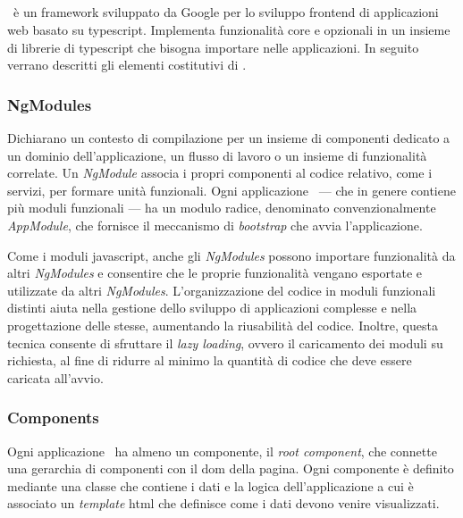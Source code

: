 \subsection{\angular}

\angular~è un \gls{framework} sviluppato da Google per lo sviluppo \gls{frontend} di applicazioni web basato su \gls{typescript}. Implementa funzionalità core e opzionali in un insieme di librerie di \gls{typescript} che bisogna importare nelle applicazioni. In seguito verrano descritti gli elementi costitutivi di \angular.


\subsubsection{NgModules}
Dichiarano un contesto di compilazione per un insieme di componenti dedicato a un dominio dell'applicazione, un flusso di lavoro o un insieme di funzionalità correlate. Un \textit{NgModule} associa i propri componenti al codice relativo, come i servizi, per formare unità funzionali.
% 
Ogni applicazione \angular~--- che in genere contiene più moduli funzionali ---  ha un modulo radice, denominato convenzionalmente \textit{AppModule}, che fornisce il meccanismo di \textit{bootstrap} che avvia l'applicazione.

Come i moduli \gls{javascript}, anche gli \textit{NgModules} possono importare funzionalità da altri \textit{NgModules} e consentire che le proprie funzionalità vengano esportate e utilizzate da altri \textit{NgModules}.
%
L'organizzazione del codice in moduli funzionali distinti aiuta nella gestione dello sviluppo di applicazioni complesse e nella progettazione delle stesse, aumentando la riusabilità del codice. Inoltre, questa tecnica consente di sfruttare il \textit{lazy loading}, ovvero il caricamento dei moduli su richiesta, al fine di ridurre al minimo la quantità di codice che deve essere caricata all'avvio.

\subsubsection{Components}

Ogni applicazione \angular~ha almeno un componente, il \textit{root component}, che connette una gerarchia di componenti con il \acrshort{dom} della pagina. Ogni componente è definito mediante una classe che contiene i dati e la logica dell'applicazione a cui è associato un \textit{template} \acrshort{html} che definisce come i dati devono venire visualizzati.

